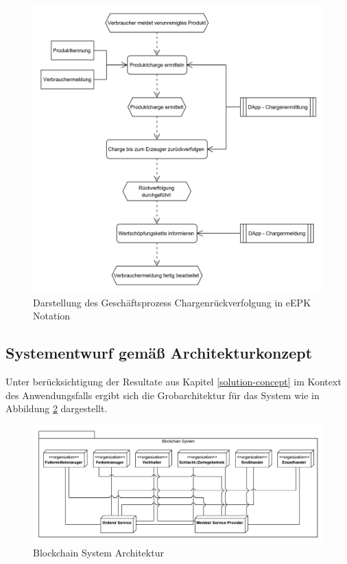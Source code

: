 \begin{figure}[H]
	\centering
	\includegraphics[width=1\linewidth]{pictures/business-process-target-epc-diagram-bw}
	\caption[Darstellung des Geschäftsprozess Chargenrückverfolgung in eEPK Notation]{Darstellung des Geschäftsprozess Chargenrückverfolgung in eEPK Notation}
	\label{fig:target-business-process}
\end{figure}

\subsection{Systementwurf gemäß Architekturkonzept}\label{system-design-concept}
Unter berücksichtigung der Resultate aus Kapitel \ref{solution-concept} im Kontext des Anwendungsfalls ergibt sich die Grobarchitektur für das System wie in Abbildung \ref{fig:blockchain-system-architecture} dargestellt.

\begin{figure}[H]
	\centering
	\includegraphics[width=1\linewidth]{pictures/blockchain-system-deployment-diagram}
	\caption[Blockchain System Architektur]{Blockchain System Architektur}
	\label{fig:blockchain-system-architecture}
\end{figure}

